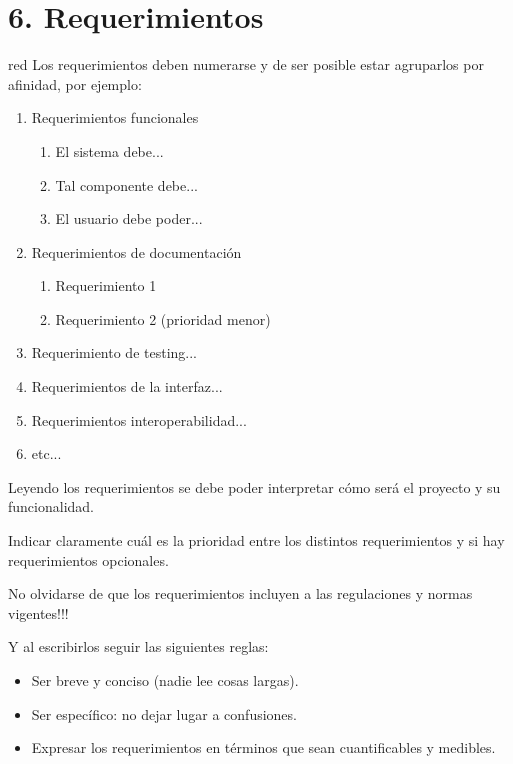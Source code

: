 \documentclass[
11pt, %
]{charter}
\begin{document}
\section{6. Requerimientos}
\label{sec:requerimientos}

\begin{consigna}{red}
Los requerimientos deben numerarse y de ser posible estar agruparlos por afinidad, por ejemplo:

\begin{enumerate}
	\item Requerimientos funcionales
		\begin{enumerate}
			\item El sistema debe...
			\item Tal componente debe...
			\item El usuario debe poder...
		\end{enumerate}
	\item Requerimientos de documentación
		\begin{enumerate}
			\item Requerimiento 1
			\item Requerimiento 2 (prioridad menor)
		\end{enumerate}
	\item Requerimiento de testing...
	\item Requerimientos de la interfaz...
	\item Requerimientos interoperabilidad...
	\item etc...
\end{enumerate}

Leyendo los requerimientos se debe poder interpretar cómo será el proyecto y su funcionalidad.

Indicar claramente cuál es la prioridad entre los distintos requerimientos y si hay requerimientos opcionales. 

No olvidarse de que los requerimientos incluyen a las regulaciones y normas vigentes!!!

Y al escribirlos seguir las siguientes reglas:
\begin{itemize}
	\item Ser breve y conciso (nadie lee cosas largas). 
	\item Ser específico: no dejar lugar a confusiones.
	\item Expresar los requerimientos en términos que sean cuantificables y medibles.
\end{itemize}

\end{consigna}
\end{document}
